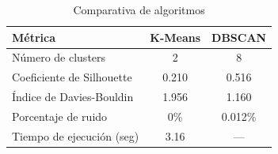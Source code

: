 \begin{table}[htbp]
\caption{Comparativa de algoritmos}
\centering
\small
\begin{tabular}{|l|c|c|}
\hline
\textbf{Métrica} & \textbf{K-Means} & \textbf{DBSCAN} \\
\hline
Número de clusters & 2 & 8 \\
Coeficiente de Silhouette & 0.210 & 0.516 \\
Índice de Davies-Bouldin & 1.956 & 1.160 \\
Porcentaje de ruido & 0\% & 0.012\% \\
Tiempo de ejecución (seg) & 3.16 & — \\
\hline
\end{tabular}
\label{tab:comparativa}
\end{table}